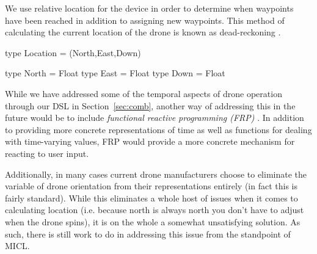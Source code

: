 \documentclass[11pt]{article}
\begin{document}
We use relative location for the device in order to determine when
waypoints have been reached in addition to assigning new waypoints. This
method of calculating the current location of the drone is known as
dead-reckoning \cite{wikipedia2016dr}.

\begin{program}
type Location = (North,East,Down)

type North = Float
type East = Float
type Down = Float
\end{program}

While we have addressed some of the temporal aspects of drone operation
through our DSL in Section~\ref{sec:comb}, another way of addressing this in
the future would be to include \emph{functional reactive programming (FRP)}
\cite{wikipedia2016frp}. In addition to providing more concrete
representations of time as well as functions for dealing with time-varying
values, FRP would provide a more concrete mechanism for reacting to user
input.

Additionally, in many cases current drone manufacturers choose to eliminate
the variable of drone orientation from their representations entirely (in fact
this is fairly standard). While this eliminates a whole host of issues when it
comes to calculating location (i.e. because north is always north you don't
have to adjust when the drone spins), it is on the whole a somewhat
unsatisfying solution. As such, there is still work to do in addressing this
issue from the standpoint of MICL.


\end{document}
